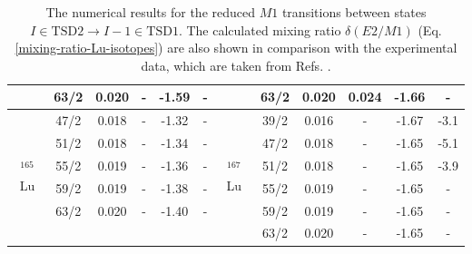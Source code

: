 \begin{table}
{\begin{tabular}{|cccccc|cc|cc|cc|}
    \multicolumn{1}{|c|}{} & \multicolumn{1}{c|}{63/2} & \multicolumn{1}{c|}{0.020} & \multicolumn{1}{c|}{-} & \multicolumn{1}{c|}{-1.59} & - & \multicolumn{1}{c|}{} & 63/2 & \multicolumn{1}{c|}{0.020} & 0.024 & \multicolumn{1}{c|}{-1.66} & - \\ \hline
    \multicolumn{1}{|c|}{\multirow{6}{*}{$^{165}$Lu}} & \multicolumn{1}{c|}{47/2} & \multicolumn{1}{c|}{0.018} & \multicolumn{1}{c|}{-} & \multicolumn{1}{c|}{-1.32} & - & \multicolumn{1}{c|}{\multirow{6}{*}{$^{167}$Lu}} & 39/2 & \multicolumn{1}{c|}{0.016} & - & \multicolumn{1}{c|}{-1.67} & -3.1 \\ \cline{2-6} \cline{8-12} 
    \multicolumn{1}{|c|}{} & \multicolumn{1}{c|}{51/2} & \multicolumn{1}{c|}{0.018} & \multicolumn{1}{c|}{-} & \multicolumn{1}{c|}{-1.34} & - & \multicolumn{1}{c|}{} & 47/2 & \multicolumn{1}{c|}{0.018} & - & \multicolumn{1}{c|}{-1.65} & -5.1 \\ \cline{2-6} \cline{8-12} 
    \multicolumn{1}{|c|}{} & \multicolumn{1}{c|}{55/2} & \multicolumn{1}{c|}{0.019} & \multicolumn{1}{c|}{-} & \multicolumn{1}{c|}{-1.36} & - & \multicolumn{1}{c|}{} & 51/2 & \multicolumn{1}{c|}{0.018} & - & \multicolumn{1}{c|}{-1.65} & -3.9 \\ \cline{2-6} \cline{8-12} 
    \multicolumn{1}{|c|}{} & \multicolumn{1}{c|}{59/2} & \multicolumn{1}{c|}{0.019} & \multicolumn{1}{c|}{-} & \multicolumn{1}{c|}{-1.38} & - & \multicolumn{1}{c|}{} & 55/2 & \multicolumn{1}{c|}{0.019} & - & \multicolumn{1}{c|}{-1.65} & - \\ \cline{2-6} \cline{8-12} 
    \multicolumn{1}{|c|}{} & \multicolumn{1}{c|}{63/2} & \multicolumn{1}{c|}{0.020} & \multicolumn{1}{c|}{-} & \multicolumn{1}{c|}{-1.40} & - & \multicolumn{1}{c|}{} & 59/2 & \multicolumn{1}{c|}{0.019} & - & \multicolumn{1}{c|}{-1.65} & - \\ \cline{2-6} \cline{8-12} 
    \multicolumn{1}{|c|}{} & \multicolumn{5}{c|}{} & \multicolumn{1}{c|}{} & 63/2 & \multicolumn{1}{c|}{0.020} & - & \multicolumn{1}{c|}{-1.65} & - \\ \hline
    \end{tabular}%
    }
    \caption{The numerical results for the reduced $M1$ transitions between states $I\in\text{TSD2}\to I-1\in\text{TSD1}$. The calculated mixing ratio $\delta(E2/M1)$ (Eq. \ref{mixing-ratio-Lu-isotopes}) are also shown in comparison with the experimental data, which are taken from Refs. \cite{gorgen2004quadrupole,jensen2002wobbling,reich2010nuclear}.}
    \label{table-M1-delta-numerical-results}
\end{table}

